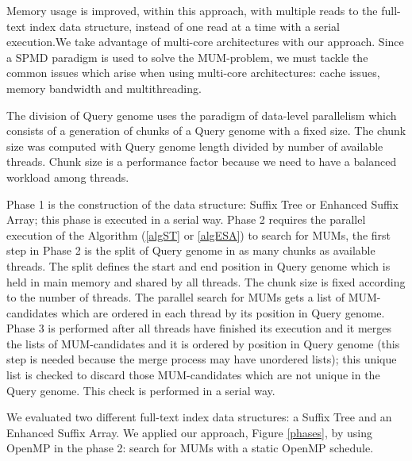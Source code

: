 \documentclass[runningheads,a4paper]{llncs}
\begin{document}
Memory usage is improved, within this approach, with multiple reads to the full-text index data structure, instead of one read at a time with a serial execution.We take advantage of multi-core architectures with our approach. Since a SPMD paradigm is used to solve the MUM-problem, we must tackle the common issues which arise when using multi-core architectures: cache issues, memory bandwidth and multithreading.

The division of Query genome uses the paradigm of data-level parallelism which consists of a generation of chunks of a Query genome with a fixed size. The chunk size was computed with Query genome length divided by number of available threads. Chunk size is a performance factor because we need to have a balanced workload among threads.

Phase 1 is the construction of the data structure: Suffix Tree or Enhanced Suffix Array; this phase is executed in a serial way. Phase 2 requires the parallel execution of the Algorithm (\ref{algST} or \ref{algESA}) to search for MUMs, the first step in Phase 2 is the split of Query genome in as many chunks as available threads. The split defines the start and end position in Query genome which is held in main memory and shared by all threads. The chunk size is fixed according to the number of threads. The parallel search for MUMs gets a list of MUM-candidates which are ordered in each thread by its position in Query genome. Phase 3 is performed after all threads have finished its execution and it merges the lists of MUM-candidates and it is ordered by position in Query genome (this step is needed because the merge process may have unordered lists); this unique list is checked to discard those MUM-candidates which are not unique in the Query genome. This check is performed in a serial way.

We evaluated two different full-text index data structures: a Suffix Tree and an Enhanced Suffix Array. We applied our approach, Figure \ref{phases}, by using OpenMP in the phase 2: search for MUMs with a static OpenMP schedule.
\end{document}
